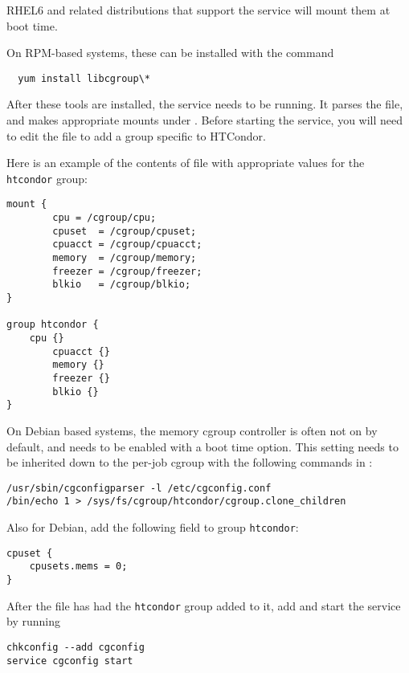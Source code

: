 RHEL6 and related distributions that support the  service 
will mount them at boot time.

On RPM-based systems, these can be installed with the command

\begin{verbatim}
  yum install libcgroup\*
\end{verbatim}

After these tools are installed, the  service needs to be
running.  It parses the  file, and makes
appropriate mounts under .  Before starting the 
service, you will need to edit the file  to
add a group specific to HTCondor.

Here is an example of the contents of file  with
appropriate values for the \texttt{htcondor} group:

\begin{verbatim}
mount {
        cpu	= /cgroup/cpu;
        cpuset	= /cgroup/cpuset;
        cpuacct = /cgroup/cpuacct;
        memory  = /cgroup/memory;
        freezer = /cgroup/freezer;
        blkio   = /cgroup/blkio;
}

group htcondor {
	cpu {}
        cpuacct {}
        memory {}
        freezer {}
        blkio {}
}
\end{verbatim}

On Debian based systems, the memory cgroup controller is often not 
on by default, and needs to be enabled with a boot time option.
This setting needs to be inherited
down to the per-job cgroup with the following commands in :

\begin{verbatim}
/usr/sbin/cgconfigparser -l /etc/cgconfig.conf
/bin/echo 1 > /sys/fs/cgroup/htcondor/cgroup.clone_children
\end{verbatim}

Also for Debian, add the following field to group \texttt{htcondor}:

\begin{verbatim}
cpuset {
	cpusets.mems = 0;
}
\end{verbatim}

After the  file has had the \texttt{htcondor} group
added to it, add and start the  service by running

\begin{verbatim}
chkconfig --add cgconfig
service cgconfig start
\end{verbatim}

